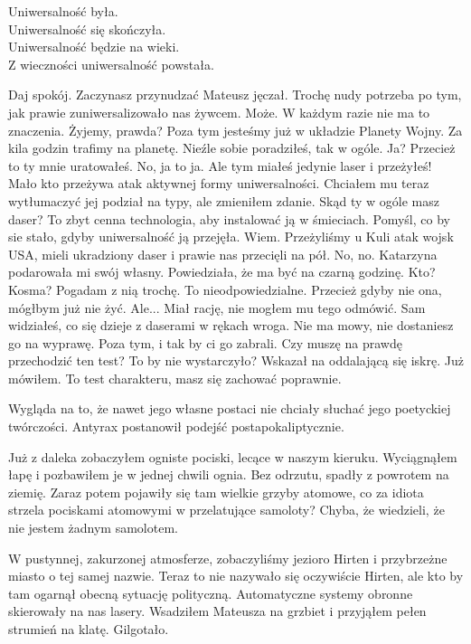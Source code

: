 Uniwersalność była. \\
Uniwersalność się skończyła. \\
Uniwersalność będzie na wieki. \\
Z wieczności uniwersalność powstała. \\

\begin{dialogue}
\ds{} Daj spokój. Zaczynasz przynudzać \dm{} Mateusz jęczał. 
\ds{} Trochę nudy potrzeba po tym, jak prawie zuniwersalizowało nas żywcem.
\ds{} Może. W każdym razie nie ma to znaczenia. Żyjemy, prawda? Poza tym jesteśmy już w układzie Planety Wojny. Za kila godzin trafimy na planetę.
\ds{} Nieźle sobie poradziłeś, tak w ogóle.
\ds{} Ja? Przecież to ty mnie uratowałeś. 
\ds{} No, ja to ja. Ale tym miałeś jedynie laser i przeżyłeś! Mało kto przeżywa atak aktywnej formy uniwersalności. \dm{} Chciałem mu teraz wytłumaczyć jej podział na typy, ale zmieniłem zdanie. \dm{}
Skąd ty w ogóle masz daser? To zbyt cenna technologia, aby instalować ją w śmieciach. Pomyśl, co by sie stało, gdyby uniwersalność ją przejęła.
\ds{} Wiem. Przeżyliśmy u Kuli atak wojsk USA, mieli ukradziony daser i prawie nas przecięli na pół.
\ds{} No, no.
\ds{} Katarzyna podarowała mi swój własny. Powiedziała, że ma być na czarną godzinę.
\ds{} Kto? Kosma? Pogadam z nią trochę. To nieodpowiedzialne.
\ds{} Przecież gdyby nie ona, mógłbym już nie żyć.
\ds{} Ale... \dm{} Miał rację, nie mogłem mu tego odmówić. \dm{} Sam widziałeś, co się dzieje z daserami w rękach wroga. Nie ma mowy, nie dostaniesz go na wyprawę.
Poza tym, i tak by ci go zabrali.
\ds{} Czy muszę na prawdę przechodzić ten test? To by nie wystarczyło? \dm{} Wskazał na oddalającą się iskrę.
\ds{} Już mówiłem. To test charakteru, masz się zachować poprawnie.
\end{dialogue}

\divider{}

Wygląda na to, że nawet jego własne postaci nie chciały słuchać jego poetyckiej twórczości.
Antyrax postanowił podejść postapokaliptycznie.

\divider{}

Już z daleka zobaczyłem ogniste pociski, lecące w naszym kieruku.
Wyciągnąłem łapę i pozbawiłem je w jednej chwili ognia.
Bez odrzutu, spadły z powrotem na ziemię.
Zaraz potem pojawiły się tam wielkie grzyby atomowe, co za idiota strzela pociskami atomowymi w przelatujące samoloty?
Chyba, że wiedzieli, że nie jestem żadnym samolotem.

W pustynnej, zakurzonej atmosferze, zobaczyliśmy jezioro Hirten i przybrzeżne miasto o tej samej nazwie.
Teraz to nie nazywało się oczywiście Hirten, ale kto by tam ogarnął obecną sytuację polityczną.
Automatyczne systemy obronne skierowały na nas lasery. 
Wsadziłem Mateusza na grzbiet i przyjąłem pełen strumień na klatę. Gilgotało.

